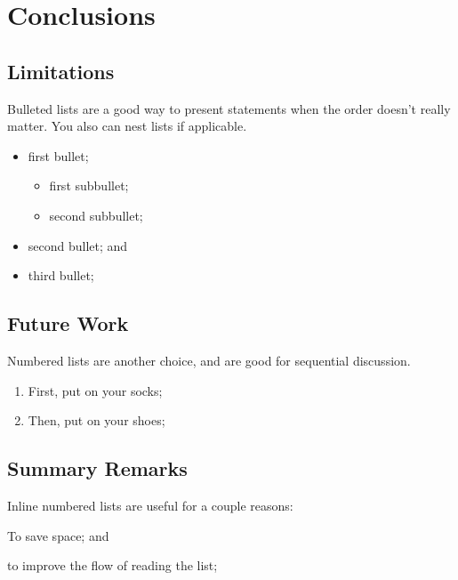 \chapter{Conclusions}
\label{Chapter:Conclusions}

\section{Limitations}
Bulleted lists are a good way to present statements when the order doesn't really matter. You also can nest lists if applicable.

\begin{itemize}
    \item first bullet;
    \begin{itemize}
        \item first subbullet;
        \item second subbullet;
    \end{itemize}
    \item second bullet; and
    \item third bullet;
\end{itemize}

\section{Future Work}
Numbered lists are another choice, and are good for sequential discussion.

\begin{enumerate}
    \item First, put on your socks;
    \item Then, put on your shoes;
\end{enumerate}

\section{Summary Remarks}
Inline numbered lists are useful for a couple reasons: 
\begin{enumerate*}
    \item To save space; and \item to improve the flow of reading the list;
\end{enumerate*}
